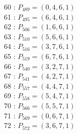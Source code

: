 \documentclass{article}
\begin{document}
{\begin{multicols}{3}
60 : $P_{489}=( 0, 4, 6, 1 )$\\
61 : $P_{495}=( 6, 4, 6, 1 )$\\
62 : $P_{506}=( 1, 6, 6, 1 )$\\
63 : $P_{510}=( 5, 6, 6, 1 )$\\
64 : $P_{516}=( 3, 7, 6, 1 )$\\
65 : $P_{519}=( 6, 7, 6, 1 )$\\
66 : $P_{540}=( 3, 2, 7, 1 )$\\
67 : $P_{541}=( 4, 2, 7, 1 )$\\
68 : $P_{557}=( 4, 4, 7, 1 )$\\
69 : $P_{558}=( 5, 4, 7, 1 )$\\
70 : $P_{566}=( 5, 5, 7, 1 )$\\
71 : $P_{569}=( 0, 6, 7, 1 )$\\
72 : $P_{572}=( 3, 6, 7, 1 )$\\
\end{multicols}


%


%


}%
\end{document}
